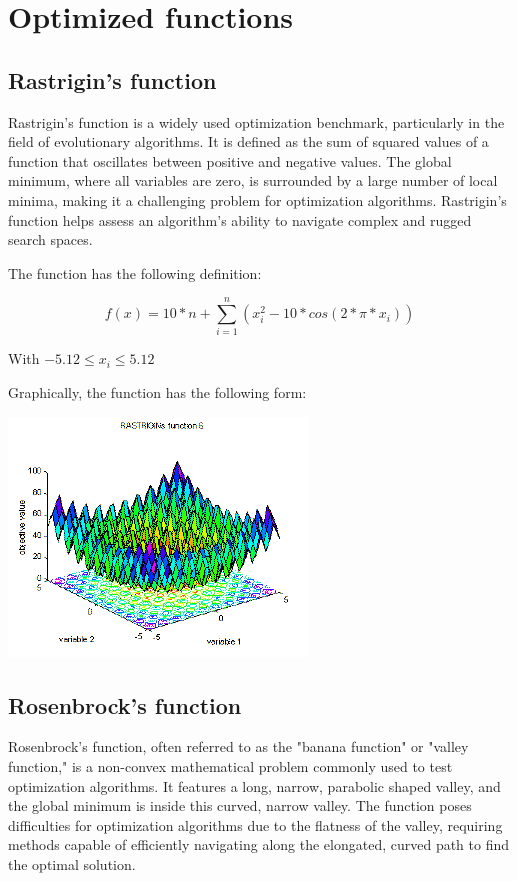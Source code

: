\documentclass[conference]{IEEEtran}
\begin{document}
\section{Optimized functions}

\subsection{Rastrigin's function}
Rastrigin's function is a widely used optimization benchmark, particularly in the field of evolutionary algorithms.
It is defined as the sum of squared values of a function that oscillates between positive and negative values. The global minimum,
where all variables are zero, is surrounded by a large number of local minima, making it a challenging problem for optimization algorithms.
Rastrigin's function helps assess an algorithm's ability to navigate complex and rugged search spaces.

The function has the following definition:

\begin{equation}
    f(x) = 10 * n + \sum_{i=1}^{n}(x_i^2 - 10 * cos(2 * \pi * x_i))
\end{equation}

With $-5.12 \le x_i \leq 5.12$

Graphically, the function has the following form:

\includegraphics[scale=0.75]{../images/fcnindex-msh_f6_5-14.gif}

\subsection{Rosenbrock's function}
Rosenbrock's function, often referred to as the "banana function" or "valley function," is a non-convex mathematical problem
commonly used to test optimization algorithms. It features a long, narrow, parabolic shaped valley, and the global minimum
is inside this curved, narrow valley. The function poses difficulties for optimization algorithms due to the flatness of the valley,
requiring methods capable of efficiently navigating along the elongated, curved path to find the optimal solution.
\end{document}
